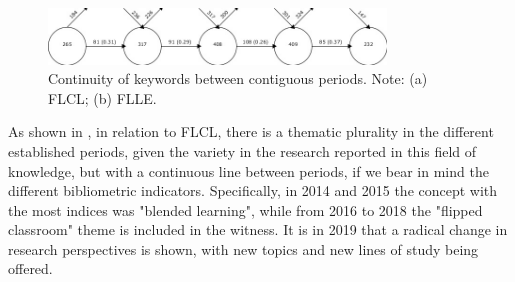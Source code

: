 \documentclass{textolivre}
\begin{document}
\begin{figure}[htbp]
 \centering
 \includegraphics[width=0.8\textwidth]{Fig02.png}
 \caption{Continuity of keywords between contiguous periods. Note: (a) FLCL; (b) FLLE.}
 \label{Fig02}
\end{figure}

As shown in , in relation to FLCL, there is a thematic plurality in the different established periods, given the variety in the research reported in this field of knowledge, but with a continuous line between periods, if we bear in mind the different bibliometric indicators. Specifically, in 2014 and 2015 the concept with the most indices was "blended learning", while from 2016 to 2018 the "flipped classroom" theme is included in the witness. It is in 2019 that a radical change in research perspectives is shown, with new topics and new lines of study being offered.
\end{document}
